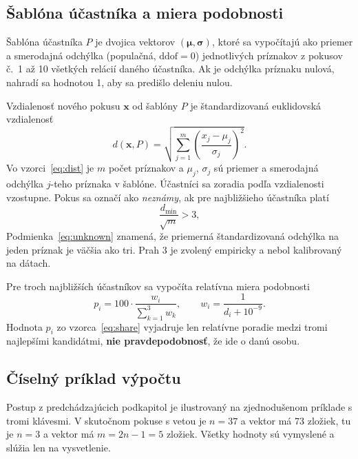 \subsection{Šablóna účastníka a miera podobnosti}

Šablóna účastníka $P$ je dvojica vektorov $(\boldsymbol{\mu}, \boldsymbol{\sigma})$,
ktoré sa vypočítajú ako priemer a smerodajná odchýlka (populačná,
$\mathrm{ddof}=0$) jednotlivých príznakov z pokusov č.~1 až 10 všetkých
relácií daného účastníka. Ak je odchýlka príznaku nulová, nahradí sa
hodnotou 1, aby sa predišlo deleniu nulou.

Vzdialenosť nového pokusu $\mathbf{x}$ od šablóny $P$ je štandardizovaná
euklidovská vzdialenosť
\begin{equation}
  \label{eq:dist}
  d(\mathbf{x}, P) = \sqrt{\sum_{j=1}^{m}\left(\frac{x_j-\mu_j}{\sigma_j}\right)^{2}}.
\end{equation}
Vo vzorci~\eqref{eq:dist} je $m$ počet príznakov a $\mu_j$, $\sigma_j$ sú priemer
a smerodajná odchýlka $j$-teho príznaka v šablóne.
Účastníci sa zoradia podľa vzdialenosti vzostupne. Pokus sa označí ako
\emph{neznámy}, ak pre najbližšieho účastníka platí
\begin{equation}
  \label{eq:unknown}
  \frac{d_{\min}}{\sqrt{m}} > 3,
\end{equation}
Podmienka~\eqref{eq:unknown} znamená, že priemerná štandardizovaná odchýlka na jeden
príznak je väčšia ako tri.
Prah 3 je zvolený empiricky a nebol kalibrovaný na dátach.

Pre troch najbližších účastníkov sa vypočíta relatívna miera podobnosti
\begin{equation}
  \label{eq:share}
  p_i = 100\cdot\frac{w_i}{\sum_{k=1}^{3} w_k}, \qquad w_i = \frac{1}{d_i + 10^{-9}}.
\end{equation}
Hodnota $p_i$ zo vzorca~\eqref{eq:share} vyjadruje len relatívne poradie medzi tromi najlepšími
kandidátmi, \textbf{nie pravdepodobnosť}, že ide o danú osobu.

\subsection{Číselný príklad výpočtu}
\label{sec:priklad}

Postup z predchádzajúcich podkapitol je ilustrovaný na zjednodušenom príklade
s tromi klávesmi. V skutočnom pokuse s vetou je $n=37$ a vektor má 73 zložiek,
tu je $n=3$ a vektor má $m=2n-1=5$ zložiek. Všetky hodnoty sú vymyslené
a slúžia len na vysvetlenie.

